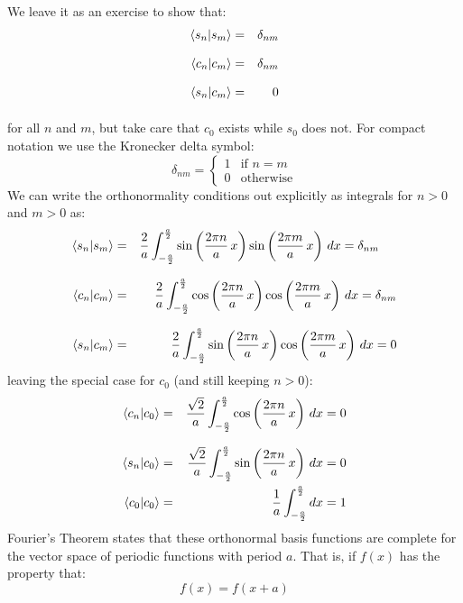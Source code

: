 \documentclass[12pt]{book}
\begin{document}
We leave it as an exercise to show that:
\begin{eqnarray}
\braket{s_n | s_m} &=& \delta_{nm}\notag\\[8pt]
\braket{c_n | c_m} &=& \delta_{nm}\notag\\[8pt]
\braket{s_n | c_m} &=& 0\notag\\[8pt]
\end{eqnarray}
for all $n$ and $m$, but take care that $c_0$ exists while $s_0$ does not.  
For compact notation we use the Kronecker delta symbol:
\begin{displaymath}
\delta_{nm} =  
\left\{
	\begin{array}{ll}
		1  & \mbox{if } n=m \\
		0 & \mbox{otherwise}
	\end{array}
\right.
\end{displaymath}
We can write the orthonormality conditions out explicitly as integrals for $n>0$ and $m>0$ as:
\begin{eqnarray}
\braket{s_n|s_m} &=& \frac{2}{a} \int_{-\frac{a}{2}}^{\frac{a}{2}} 
\sin\left(\frac{2\pi n}{a} \, x \right) \sin\left(\frac{2\pi m}{a} \, x \right) \, dx = \delta_{nm} \;\;\;\;\; \notag\\[8pt]
\braket{c_n| c_m} &=& \frac{2}{a} \int_{-\frac{a}{2}}^{\frac{a}{2}} 
\cos\left(\frac{2\pi n}{a} \, x \right) \cos\left(\frac{2\pi m}{a} \, x \right) \, dx = \delta_{nm}\notag\\[8pt]
\braket{s_n| c_m} &=& \frac{2}{a} \int_{-\frac{a}{2}}^{\frac{a}{2}} 
\sin\left(\frac{2\pi n}{a} \, x \right) \cos\left(\frac{2\pi m}{a} \, x \right) \, dx = 0 \notag\\
\end{eqnarray}
leaving the special case for $c_0$ (and still keeping $n>0$):
\begin{eqnarray}
\braket{c_n| c_0} &=& \frac{\sqrt{2}}{a} \int_{-\frac{a}{2}}^{\frac{a}{2}} 
\cos\left(\frac{2\pi n}{a} \, x \right) \, dx = 0 \notag\\[8pt]
\braket{s_n| c_0} &=& \frac{\sqrt{2}}{a} \int_{-\frac{a}{2}}^{\frac{a}{2}} 
\sin\left(\frac{2\pi n}{a} \, x \right) \, dx = 0 \notag\\
\braket{c_0| c_0} &=& \frac{1}{a} \int_{-\frac{a}{2}}^{\frac{a}{2}} dx = 1 \notag\\
\end{eqnarray}
Fourier's Theorem states that these orthonormal basis functions are complete for the vector space of periodic functions with period $a$.  That is, if $f(x)$ has the property that:
$$f(x) = f(x+a)$$
\end{document}
